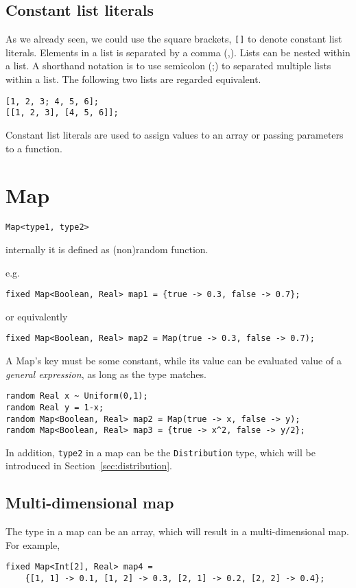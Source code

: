 \documentclass[12pt]{article}
\begin{document}
\subsection{Constant list literals}
As we already seen, we could use the square brackets, \texttt{[]} to denote constant list literals.
Elements in a list is separated by a comma (,). Lists can be nested within a list. A shorthand notation is to use semicolon (;) to separated multiple lists within a list.
The following two lists are regarded equivalent.
\begin{verbatim}
[1, 2, 3; 4, 5, 6];
[[1, 2, 3], [4, 5, 6]];
\end{verbatim}

Constant list literals are used to assign values to an array or passing parameters to a function.

\section{Map}
\begin{verbatim}
Map<type1, type2>
\end{verbatim}
internally it is defined as (non)random function.

e.g. 
\begin{verbatim}
fixed Map<Boolean, Real> map1 = {true -> 0.3, false -> 0.7};
\end{verbatim}
or equivalently 
\begin{verbatim}
fixed Map<Boolean, Real> map2 = Map(true -> 0.3, false -> 0.7);
\end{verbatim}

A Map's key must be some constant, while its value can be evaluated value of a \emph{general expression}, as long as the type matches.
\begin{verbatim}
random Real x ~ Uniform(0,1);
random Real y = 1-x;
random Map<Boolean, Real> map2 = Map(true -> x, false -> y);
random Map<Boolean, Real> map3 = {true -> x^2, false -> y/2};
\end{verbatim}

In addition, \texttt{type2}  in a map can be the \texttt{Distribution} type, which will be introduced in Section~\ref{sec:distribution}.

\subsection{Multi-dimensional map}
The type in a map can be an array, which will result in a multi-dimensional map.
For example,
\begin{verbatim}
fixed Map<Int[2], Real> map4 = 
    {[1, 1] -> 0.1, [1, 2] -> 0.3, [2, 1] -> 0.2, [2, 2] -> 0.4};
\end{verbatim}
\end{document}
